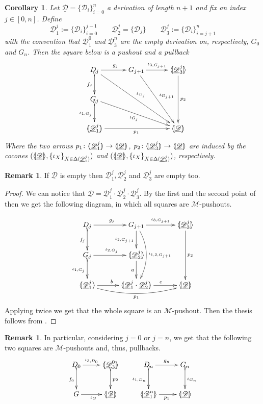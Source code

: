 \documentclass[a4paper]{article}
\newcommand{\dder}[1]{\mathscr{#1}}
\newcommand{\der}[1]{\underline{\dder{#1}}}
\newcommand{\lpro}{\langle \hspace{-1.85pt}[}
\newcommand{\rpro}{]\hspace{-1.85pt}\rangle}
\newcommand{\tpro}[1]{\lpro \der{#1}\rpro}
\newtheorem{corollary}[theorem]{Corollary}
\theoremstyle{definition}
\newtheorem{remark}[theorem]{Remark}
\begin{document}
\begin{corollary}\label{cor:colim}
Let $\der{D}=\{\dder{D}_i\}_{i=0}^n$ a derivation of length $n+1$ and fix an index $j\in[0,n]$. Define
\[\der{D}^j_1:=\{\dder{D}_i\}_{i=0}^{j-1} \qquad  \der{D}^j_2=\{\dder{D}_j\} \qquad \der{D}^j_3:=\{\dder{D}_i\}_{i=j+1}^n\]
with the convention that $\der{D}^0_1$ and $\der{D}^n_3$ are the empty derivation on, respectively, $G_0$ and $G_n$. Then the square below is a pushout and a pullback
\[\xymatrix@C=30pt{D_{j} \ar[ddrr]^{\iota_{D_j}} \ar[r]^{g_j}\ar@{>->}[d]_{f_j}& G_{j+1} \ar[ddr]^{\iota_{G_{j+1}}} \ar[r]^-{\iota_{3, G_{j+1}}} & \lpro \der{D}^j_3\rpro \ar[dd]^{p_2} \\ G_j\ar[drr]_{\iota_{G_{j}}} \ar@{>->}[d]_{\iota_{1,G_j}}\\ \lpro \der{D}^j_1 \rpro \ar[rr]_{p_1}  &&\tpro{D} }\] 
Where the two arrows $p_1\colon \lpro\der{D}^j_1 \rpro\to \tpro{D}$, $p_2\colon \lpro \der{D}^j_3\rpro \to \tpro{D}$ are induced by the cocones $(\tpro{D}, \{\iota_{X}\}_{X\in \Delta(\der{D}^j_1)})$ and $(\tpro{D}, \{\iota_{X}\}_{X\in \Delta(\der{D}^j_3)})$, respectively.
\end{corollary}
\begin{remark}
If $\der{D}$ is empty then $\der{D}^j_1, \der{D}^j_2$ and $\der{D}^j_3$ are empty too.
\end{remark}
\begin{proof}
We can notice that $\der{D}=\der{D}^j_1\cdot \der{D}^j_2 \cdot \der{D}^j_3$. By the first and the second point of  then we get the following diagram, in which all squares are $\mathcal{M}$-pushouts.

\[\xymatrix@C=30pt{D_{j}  \ar[r]^{g_j}\ar@{>->}[d]_{f_j}& G_{j+1}  \ar[r]^-{\iota_{3,G_{j+1}}} \ar[d]_{\iota_{2, G_{j+1}}}  \ar@/^.5cm/[dd]^{\iota_{1,2, G_{j+1}}}& \lpro \der{D}^j_3\rpro \ar[dd]^{p_2} \\ G_j \ar[r]^{\iota_{2, G_j}}\ar@{>->}[d]_{\iota_{1,G_j}} & \lpro \der{D}^j_2\rpro \ar[d]_a\\ \lpro \der{D}^j_1 \rpro \ar@/_.4cm/[rr]_{p_1} \ar[r]^b &\lpro \der{D}^j_1\cdot \der{D}^j_2 \rpro \ar[r]^c&\tpro{D} }\] 
Applying  twice we get that the whole square is an $\mathcal{M}$-pushout. Then the thesis follows from .
\end{proof}

\begin{remark}\label{rem:zero1} In particular, considering $j=0$ or $j=n$, we get that the following two squares are $\mathcal{M}$-pushouts and, thus, pullbacks.
	\[\xymatrix{D_0 \ar[r]^-{\iota_{3, D_0}} \ar@{>->}[d]_{f_0}& \lpro \der{D}^0_3 \rpro \ar@{>->}[d]^{p_2} &D_n \ar@{>->}[d]_{\iota_{1, D_n}}\ar[r]^{g_n}& G_n \ar@{>->}[d]^{\iota_{G_n}}\\ G \ar[r]_{\iota_G}& \tpro{D} & \lpro \der{D}^n_1 \rpro \ar[r]_{p_1}  & \tpro{D}}\]
\end{remark}
\end{document}
